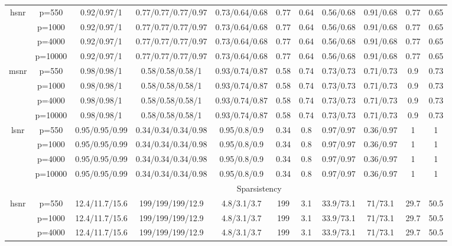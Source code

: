\begin{table}[ht]
{\begin{tabular}{|c|c|ccccccccc|}
\midrule\multirow{4}[2]{*}{hsnr} & p=550 & 0.92/0.97/1 & 0.77/0.77/0.77/0.97 & 0.73/0.64/0.68 & 0.77 & 0.64 & 0.56/0.68 & 0.91/0.68 & 0.77 & 0.65 \\ 
   & p=1000 & 0.92/0.97/1 & 0.77/0.77/0.77/0.97 & 0.73/0.64/0.68 & 0.77 & 0.64 & 0.56/0.68 & 0.91/0.68 & 0.77 & 0.65 \\ 
   & p=4000 & 0.92/0.97/1 & 0.77/0.77/0.77/0.97 & 0.73/0.64/0.68 & 0.77 & 0.64 & 0.56/0.68 & 0.91/0.68 & 0.77 & 0.65 \\ 
   & p=10000 & 0.92/0.97/1 & 0.77/0.77/0.77/0.97 & 0.73/0.64/0.68 & 0.77 & 0.64 & 0.56/0.68 & 0.91/0.68 & 0.77 & 0.65 \\ 
  \midrule\multirow{4}[2]{*}{msnr} & p=550 & 0.98/0.98/1 & 0.58/0.58/0.58/1 & 0.93/0.74/0.87 & 0.58 & 0.74 & 0.73/0.73 & 0.71/0.73 & 0.9 & 0.73 \\ 
   & p=1000 & 0.98/0.98/1 & 0.58/0.58/0.58/1 & 0.93/0.74/0.87 & 0.58 & 0.74 & 0.73/0.73 & 0.71/0.73 & 0.9 & 0.73 \\ 
   & p=4000 & 0.98/0.98/1 & 0.58/0.58/0.58/1 & 0.93/0.74/0.87 & 0.58 & 0.74 & 0.73/0.73 & 0.71/0.73 & 0.9 & 0.73 \\ 
   & p=10000 & 0.98/0.98/1 & 0.58/0.58/0.58/1 & 0.93/0.74/0.87 & 0.58 & 0.74 & 0.73/0.73 & 0.71/0.73 & 0.9 & 0.73 \\ 
  \midrule\multirow{4}[2]{*}{lsnr} & p=550 & 0.95/0.95/0.99 & 0.34/0.34/0.34/0.98 & 0.95/0.8/0.9 & 0.34 & 0.8 & 0.97/0.97 & 0.36/0.97 & 1 & 1 \\ 
   & p=1000 & 0.95/0.95/0.99 & 0.34/0.34/0.34/0.98 & 0.95/0.8/0.9 & 0.34 & 0.8 & 0.97/0.97 & 0.36/0.97 & 1 & 1 \\ 
   & p=4000 & 0.95/0.95/0.99 & 0.34/0.34/0.34/0.98 & 0.95/0.8/0.9 & 0.34 & 0.8 & 0.97/0.97 & 0.36/0.97 & 1 & 1 \\ 
   & p=10000 & 0.95/0.95/0.99 & 0.34/0.34/0.34/0.98 & 0.95/0.8/0.9 & 0.34 & 0.8 & 0.97/0.97 & 0.36/0.97 & 1 & 1 \\ 
   \midrule 
 \multicolumn{1}{|c}{} &       & \multicolumn{9}{c|}{Sparsistency} \\
\midrule\multirow{4}[2]{*}{hsnr} & p=550 & 12.4/11.7/15.6 & 199/199/199/12.9 & 4.8/3.1/3.7 & 199 & 3.1 & 33.9/73.1 & 71/73.1 & 29.7 & 50.5 \\ 
   & p=1000 & 12.4/11.7/15.6 & 199/199/199/12.9 & 4.8/3.1/3.7 & 199 & 3.1 & 33.9/73.1 & 71/73.1 & 29.7 & 50.5 \\ 
   & p=4000 & 12.4/11.7/15.6 & 199/199/199/12.9 & 4.8/3.1/3.7 & 199 & 3.1 & 33.9/73.1 & 71/73.1 & 29.7 & 50.5 \\ 

\end{tabular}}
\end{table}
